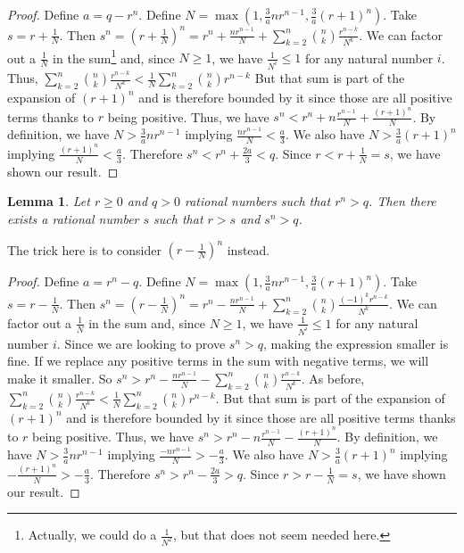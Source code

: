 \documentclass[12pt]{article}
\newtheorem{lemma}{Lemma}[subsection]
\begin{document}
\begin{proof}
Define $a = q - r^n$. Define $N =  \max(1,\tfrac{3}{a}n r^{n-1}, \tfrac{3}{a}(r+1)^n)$.  Take $s = r + \tfrac{1}{N}$. Then $s^n = (r+ \tfrac{1}{N})^n = r^n + \tfrac{n r^{n-1}}{N} + \sum_{k=2}^{n} \binom{n}{k} \tfrac{r^{n-k}}{N^k}$. We can factor out a $\tfrac{1}{N}$ in the sum\footnote{Actually, we could do a $\frac{1}{N^2}$, but that does not seem needed here.} and, since $N \geq 1$, we have $\tfrac{1}{N^i} \leq  1$ for any natural number $i$. Thus, $\sum_{k=2}^{n} \binom{n}{k} \tfrac{r^{n-k}}{N^k} < \tfrac{1}{N} \sum_{k=2}^{n} \binom{n}{k} r^{n-k}$  But that sum is part of the expansion of $(r+1)^n$ and is therefore bounded by it since those are all positive terms thanks to $r$ being positive. Thus, we have $s^n < r^n + n \tfrac{r^{n-1}}{N} + \tfrac{ (r+1)^n }{N}$.  By definition, we have $N > \tfrac{3}{a} n r^{n-1}$ implying $\tfrac{ n r^{n-1}}{N} < \tfrac{a}{3}$. We also have $N > \tfrac{3}{a} (r+1)^n$ implying $ \tfrac{(r+1)^n}{N} < \tfrac{a}{3}$. Therefore $s^n < r^n + \tfrac{2 a}{3} < q$. Since $r< r + \frac{1}{N} = s$, we have shown our result. 
\end{proof}

\begin{lemma}\label{app:greater}
Let $r \geq 0 $ and $q > 0$ rational numbers such that $r^n > q$. Then there exists a rational number $s$ such that $r > s$ and $s^n > q$.
\end{lemma}

The trick here is to consider $(r-\tfrac{1}{N})^n$ instead. 

\begin{proof}
Define $a = r^n - q$. Define $N =  \max(1,\tfrac{3}{a}n r^{n-1}, \tfrac{3}{a}(r+1)^n)$.  Take $s = r - \tfrac{1}{N}$. Then $s^n = (r- \tfrac{1}{N})^n = r^n - \tfrac{n r^{n-1}}{N} + \sum_{k=2}^{n} \binom{n}{k} \tfrac{ (-1)^{k} r^{n-k}}{N^{k}}$. We can factor out a $\tfrac{1}{N}$ in the sum and, since $N \geq 1$, we have $\tfrac{1}{N^i} \leq 1$ for any natural number $i$. Since we are looking to prove $s^n > q$, making the expression smaller is fine. If we replace any positive terms in the sum with negative terms, we will make it smaller. So $s^n > r^n - \tfrac{n r^{n-1}}{N} - \sum_{k=2}^{n} \binom{n}{k} \tfrac{r^{n-k}}{N^{k}}$. As before, $\sum_{k=2}^{n} \binom{n}{k} \tfrac{r^{n-k}}{N^{k}} < \tfrac{1}{N} \sum_{k=2}^{n} \binom{n}{k} r^{n-k}$.  But that sum is part of the expansion of $(r+1)^n$ and is therefore bounded by it since those are all positive terms thanks to $r$ being positive. Thus, we have $s^n > r^n - n \tfrac{r^{n-1}}{N} - \tfrac{ (r+1)^n }{N}$.  By definition, we have $N > \tfrac{3}{a} n r^{n-1}$ implying $ \tfrac{-n r^{n-1}}{N} > -\tfrac{a}{3}$. We also have $N > \tfrac{3}{a} (r+1)^n$ implying $ -\tfrac{(r+1)^n}{N} > -\tfrac{a}{3}$. Therefore $s^n > r^n - \tfrac{2 a}{3} > q$. Since $r> r - \frac{1}{N} = s$, we have shown our result. 
\end{proof}
\end{document}
